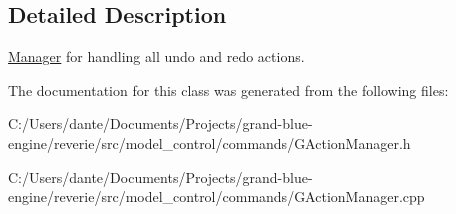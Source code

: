 \subsection{Detailed Description}
\mbox{\hyperlink{classrev_1_1_manager}{Manager}} for handling all undo and redo actions. 

The documentation for this class was generated from the following files\+:\begin{DoxyCompactItemize}
\item 
C\+:/\+Users/dante/\+Documents/\+Projects/grand-\/blue-\/engine/reverie/src/model\+\_\+control/commands/G\+Action\+Manager.\+h\item 
C\+:/\+Users/dante/\+Documents/\+Projects/grand-\/blue-\/engine/reverie/src/model\+\_\+control/commands/G\+Action\+Manager.\+cpp\end{DoxyCompactItemize}
